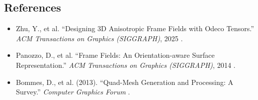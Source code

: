 \subsection{References}
\begin{itemize}
  \item Zhu, Y., et al. ``Designing 3D Anisotropic Frame Fields with Odeco Tensors.'' \textit{ACM Transactions on Graphics (SIGGRAPH)}, 2025 \cite{zhu2025}.
  \item Panozzo, D., et al. ``Frame Fields: An Orientation-aware Surface Representation.'' \textit{ACM Transactions on Graphics (SIGGRAPH)}, 2014 \cite{panozzo2014}.
  \item Bommes, D., et al. (2013). ``Quad-Mesh Generation and Processing: A Survey.'' \textit{Computer Graphics Forum} \cite{bommes2013}.
\end{itemize}

